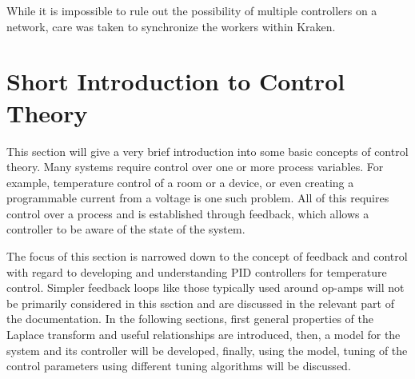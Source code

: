 While it is impossible to rule out the possibility of multiple controllers on a network, care was taken to synchronize the workers within Kraken.

\clearpage
\section{Short Introduction to Control Theory}
This section will give a very brief introduction into some basic concepts of control theory. Many systems require control over one or more process variables. For example, temperature control of a room or a device, or even creating a programmable current from a voltage is one such problem. All of this requires control over a process and is established through feedback, which allows a controller to be aware of the state of the system.

The focus of this section is narrowed down to the concept of feedback and control with regard to developing and understanding PID controllers for temperature control. Simpler feedback loops like those typically used around op-amps will not be primarily considered in this ssction and are discussed in the relevant part of the documentation. In the following sections, first general properties of the Laplace transform and useful relationships are introduced, then, a model for the system and its controller will be developed, finally, using the model, tuning of the control parameters using different tuning algorithms will be discussed.

